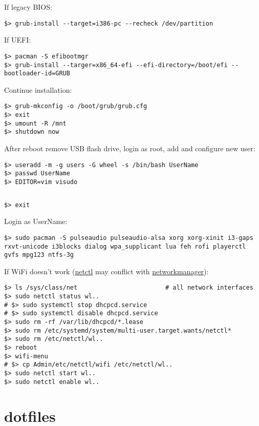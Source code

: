 \documentclass[a4paper, 12pt]{article}
\begin{document}
If legacy BIOS:
\begin{lstlisting}
$> grub-install --target=i386-pc --recheck /dev/partition
\end{lstlisting}

If UEFI:
\begin{lstlisting}
$> pacman -S efibootmgr
$> grub-install --targer=x86_64-efi --efi-directory=/boot/efi --bootloader-id=GRUB
\end{lstlisting}

Continue installation:
\begin{lstlisting}
$> grub-mkconfig -o /boot/grub/grub.cfg
$> exit
$> umount -R /mnt
$> shutdown now
\end{lstlisting}

After reboot remove USB flash drive, login as root, add and configure new user:
\begin{lstlisting}
$> useradd -m -g users -G wheel -s /bin/bash UserName
$> passwd UserName
$> EDITOR=vim visudo
\end{lstlisting}

\begin{lstlisting}[style=style_file,caption={sudoers uncomment:}]
%wheel=ALL (ALL) ALL
\end{lstlisting}

\begin{lstlisting}
$> exit
\end{lstlisting}

Login as UserName:
\begin{lstlisting}
$> sudo pacman -S pulseaudio pulseaudio-alsa xorg xorg-xinit i3-gaps rxvt-unicode i3blocks dialog wpa_supplicant lua feh rofi playerctl gvfs mpg123 ntfs-3g
\end{lstlisting}

If WiFi doesn't work (\url{netctl} may conflict with \url{networkmanager}):
\begin{lstlisting}
$> ls /sys/class/net                        # all network interfaces
$> sudo netctl status wl..
# $> sudo systemctl stop dhcpcd.service
# $> sudo systemctl disable dhcpcd.service
$> sudo rm -rf /var/lib/dhcpcd/*.lease
$> sudo rm /etc/systemd/system/multi-user.target.wants/netctl*
$> sudo rm /etc/netctl/wl..
$> reboot
$> wifi-menu
# $> cp Admin/etc/netctl/wifi /etc/netctl/wl..
$> sudo netctl start wl..
$> sudo netctl enable wl..
\end{lstlisting}

\section{dotfiles}
\end{document}
